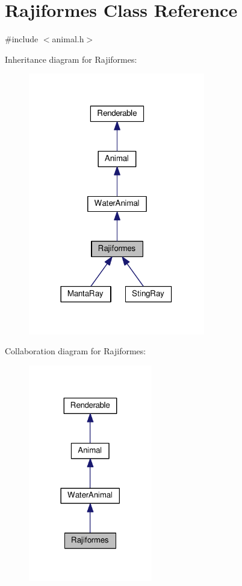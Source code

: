 \hypertarget{classRajiformes}{}\section{Rajiformes Class Reference}
\label{classRajiformes}


{\ttfamily \#include $<$animal.\+h$>$}



Inheritance diagram for Rajiformes\+:
\nopagebreak
\begin{figure}[H]
\begin{center}
\leavevmode
\includegraphics[width=218pt]{classRajiformes__inherit__graph}
\end{center}
\end{figure}


Collaboration diagram for Rajiformes\+:
\nopagebreak
\begin{figure}[H]
\begin{center}
\leavevmode
\includegraphics[width=153pt]{classRajiformes__coll__graph}
\end{center}
\end{figure}

